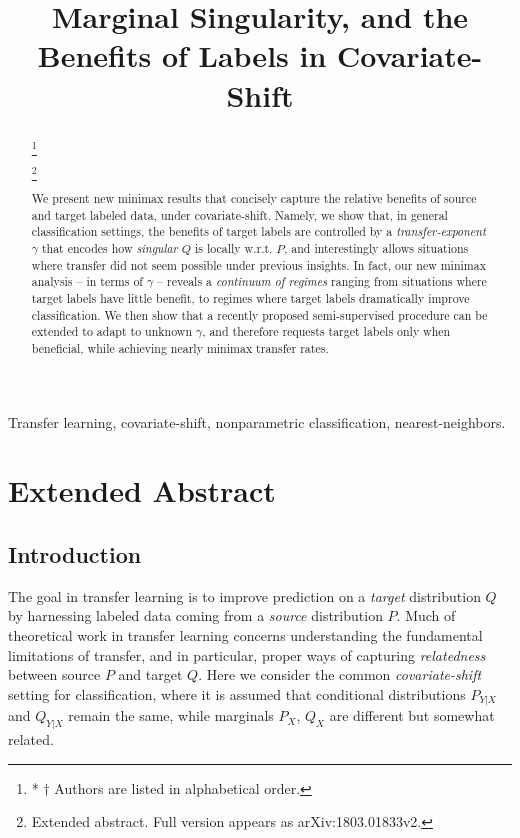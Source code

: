 \documentclass[final,12pt]{colt2018} %
\title[Minimax Transfer]{Marginal Singularity, and the Benefits of Labels in Covariate-Shift}
\newcommand\blfootnote[1]{%
  \begingroup
  \renewcommand\thefootnote{}\footnote{#1}%
  \addtocounter{footnote}{-1}%
  \endgroup
}
\begin{document}
\maketitle


\begin{abstract} \blfootnote{* $\dagger$ Authors are listed in alphabetical order.} \blfootnote{Extended abstract. Full version appears as 
arXiv:1803.01833v2.} 
We present new minimax results that concisely capture the relative benefits of source and target labeled data, under {covariate-shift}. Namely, we show that, in general classification settings, the benefits of target labels are controlled by a \emph{transfer-exponent} $\gamma$ that encodes how \emph{singular} $Q$ is locally w.r.t. $P$, and interestingly allows situations where transfer did not seem possible under previous insights. In fact, our new minimax analysis -- in terms of $\gamma$ -- reveals a \emph{continuum of regimes} ranging from situations where target labels have little benefit, to regimes where target labels dramatically improve classification. 
We then show that a recently proposed semi-supervised procedure can be extended to adapt to unknown $\gamma$, and therefore requests target labels only when beneficial, while achieving nearly minimax transfer rates. 
\end{abstract}

\begin{keywords}
Transfer learning, covariate-shift, nonparametric classification, nearest-neighbors.
\end{keywords}
\text{} 

\section*{Extended Abstract}
\subsection*{Introduction}
The goal in transfer learning is to improve prediction on a \emph{target} distribution $Q$ by harnessing labeled data coming from a \emph{source} distribution $P$. Much of theoretical work in transfer learning concerns understanding the fundamental limitations of transfer, and in particular, proper ways of capturing \emph{relatedness} between source $P$ and target $Q$. Here we consider the common \emph{covariate-shift} setting for classification, where it is assumed that conditional distributions $P_{Y|X}$ and $Q_{Y|X}$ remain the same, while marginals $P_X$, $Q_X$ are different but somewhat related. 
\end{document}
